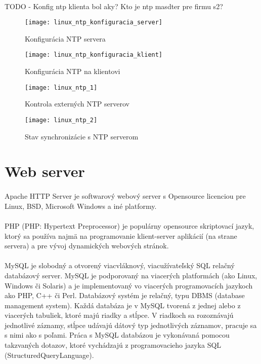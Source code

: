 \paragraph{}
TODO - Konfig ntp klienta bol aky? Kto je ntp masdter pre firmu s2?

\begin{figure}[!htb]
\centering
\texttt{[image: linux\_ntp\_konfiguracia\_server]}
\caption{Konfigurácia NTP servera}
\label{fig:ntp_config_server}
\end{figure}

\begin{figure}[!htb]
\centering
\texttt{[image: linux\_ntp\_konfiguracia\_klient]}
\caption{Konfigurácia NTP na klientovi}
\label{fig:ntp_config_client}
\end{figure}

\begin{figure}[!htb]
\centering
\texttt{[image: linux\_ntp\_1]}
\caption{Kontrola externých NTP serverov}
\label{fig:ntp_config_valid_1}
\end{figure}

\begin{figure}[!htb]
\centering
\texttt{[image: linux\_ntp\_2]}
\caption{Stav synchronizácie s NTP serverom}
\label{fig:ntp_config_valid_2}
\end{figure}

\section{Web server}
\paragraph{}
Apache HTTP Server je softwarový webový server s Opensource licenciou pre Linux, BSD, Microsoft Windows a iné platformy.
\paragraph{}
PHP (PHP: Hypertext Preprocessor) je populárny opensource skriptovací jazyk, ktorý sa používa najmä na programovanie klient-server aplikácií (na strane servera) a pre vývoj dynamických webových stránok.
\paragraph{}
MySQL je slobodný a otvorený viacvláknový, viacužívateľský SQL relačný databázový server. MySQL je podporovaný na viacerých platformách (ako Linux, Windows či Solaris) a je implementovaný vo viacerých programovacích jazykoch ako PHP, C++ či Perl. Databázový systém je relačný, typu DBMS (database management system). Každá databáza je v MySQL tvorená z jednej alebo z viacerých tabuliek, ktoré majú riadky a stĺpce. V riadkoch sa rozoznávajú jednotlivé záznamy, stĺpce udávajú dátový typ jednotlivých záznamov, pracuje sa s nimi ako s poľami. Práca s MySQL databázou je vykonávaná pomocou takzvaných dotazov, ktoré vychádzajú z programovacieho jazyka SQL (StructuredQueryLanguage).

